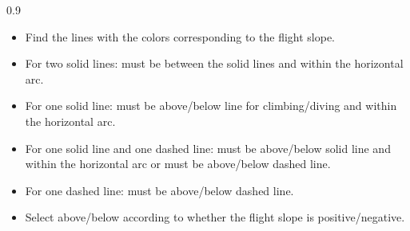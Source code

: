 \newcommand{\lowerlimit}[5]{
    \draw [#1,color=#2,very thick] (#4,#5) -- (2*\xmax+#4,(2*\xmax*#3+#5);
}
\newcommand{\upperlimit}[5]{
    \draw [#1,color=#2,very thick] (#4,#5) -- (2*\xmax+#4,(2*\xmax*#3+#5);
}

\newcommand{\combinedarcnote}{
    \begin{tablenote}{0.9\textwidth}\footnotesize
        \begin{itemize}
            \item Find the lines with the colors corresponding to the flight slope.
            \item For two solid lines: must be between the solid lines and within the horizontal arc.
            \item For one solid line: must be above/below line for climbing/diving and within the horizontal arc.
            \item For one solid line and one dashed line: must be above/below solid line and within the horizontal arc or must be above/below dashed line.
            \item For one dashed line: must be above/below dashed line.
            \item Select above/below according to whether the flight slope is positive/negative.
        \end{itemize}
    \end{tablenote}
}



\begin{twocolumnfigure}

\combinedarcnote


\end{twocolumnfigure}
\clearpage

